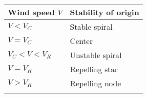 \begin{figure}
\begin{minipage}[b]{0.6\textwidth}
\label{fig:eigencup}
\end{minipage}
\hfill
\begin{minipage}[b]{0.6\textwidth}
\centering
\begin{tabular}{@{}ll@{}} \toprule
Wind speed $V$    & Stability of origin \\
\midrule
$V < V_C$         & Stable spiral       \\[1em]
$V = V_C$         & Center              \\[1em]
$V_C < V < V_R $  & Unstable spiral     \\[1em]
$V = V_R$         & Repelling star      \\[1em]
$V > V_R$         & Repelling node      \\[1em]
\bottomrule
\vspace{26pt}
\end{tabular}
\label{tab:fp_class}
\vspace{26pt}
\end{minipage}
\end{figure}


\begin{figure}
\label{fig:bridge_phase}
\end{figure}
